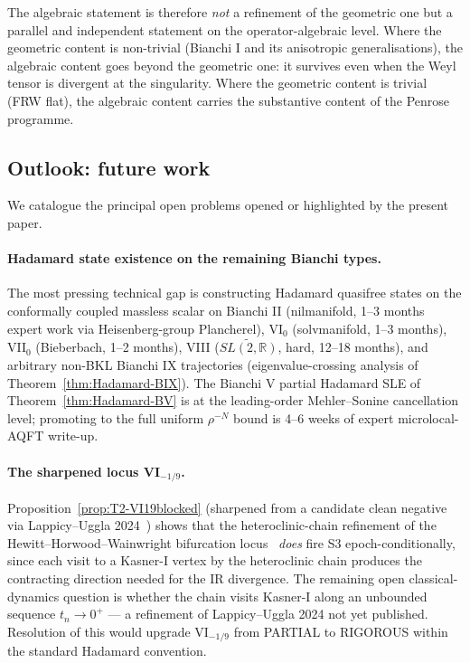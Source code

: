 \documentclass[11pt]{article}
\theoremstyle{definition}
\newcommand{\R}{\mathbb{R}}
\begin{document}
The algebraic statement is therefore \emph{not} a refinement of the geometric one but a parallel and independent statement on the operator-algebraic level. Where the geometric content is non-trivial (Bianchi I and its anisotropic generalisations), the algebraic content goes beyond the geometric one: it survives even when the Weyl tensor is divergent at the singularity. Where the geometric content is trivial (FRW flat), the algebraic content carries the substantive content of the Penrose programme.

\subsection{Outlook: future work}\label{sec:outlook}

We catalogue the principal open problems opened or highlighted by the present paper.

\paragraph{Hadamard state existence on the remaining Bianchi types.} The most pressing technical gap is constructing Hadamard quasifree states on the conformally coupled massless scalar on Bianchi II (nilmanifold, 1--3 months expert work via Heisenberg-group Plancherel), VI$_0$ (solvmanifold, 1--3 months), VII$_0$ (Bieberbach, 1--2 months), VIII ($\widetilde{SL(2,\R)}$, hard, 12--18 months), and arbitrary non-BKL Bianchi IX trajectories (eigenvalue-crossing analysis of Theorem~\ref{thm:Hadamard-BIX}). The Bianchi V partial Hadamard SLE of Theorem~\ref{thm:Hadamard-BV} is at the leading-order Mehler--Sonine cancellation level; promoting to the full uniform $\rho^{-N}$ bound is 4--6 weeks of expert microlocal-AQFT write-up.

\paragraph{The sharpened locus VI$_{-1/9}$.} Proposition~\ref{prop:T2-VI19blocked} (sharpened from a candidate clean negative via Lappicy--Uggla 2024~\cite{LappicyUggla2024}) shows that the heteroclinic-chain refinement of the Hewitt--Horwood--Wainwright bifurcation locus~\cite{HewittHorwoodWainwright2003} \emph{does} fire S3 epoch-conditionally, since each visit to a Kasner-I vertex by the heteroclinic chain produces the contracting direction needed for the IR divergence. The remaining open classical-dynamics question is whether the chain visits Kasner-I along an unbounded sequence $t_n\to 0^+$ — a refinement of Lappicy--Uggla 2024 not yet published. Resolution of this would upgrade VI$_{-1/9}$ from PARTIAL to RIGOROUS within the standard Hadamard convention.
\end{document}
